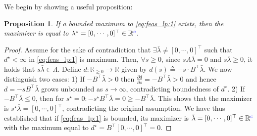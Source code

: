 \documentclass[letterpaper, 10 pt, conference]{ieeeconf}  %
\newtheorem{proposition}{\textbf{Proposition}}
\begin{document}
We begin by showing a useful proposition:
\begin{proposition}\label{prop:lambda_zero}
    If a bounded {\color{blue} maximum} to \eqref{eq:feas_lp:1} exists, then {\color{blue}the maximizer is equal to} $\lambda^\star = [0,\cdots,0]^\top \in \mathbb{R}{\color{blue}^c}$.
\end{proposition}
\begin{proof}
    Assume for the sake of contradiction that $\exists \bar{\lambda}\neq [0,\cdots,0]^\top$ such that {\color{blue} $d^\star < \infty$ in} \eqref{eq:feas_lp:1} is maximum. Then, $\forall s \geq 0$, since $s A \bar{\lambda} = 0$ and $s\bar{\lambda} \geq 0$, it holds that  $s\bar{\lambda} \in\Lambda$. Define $d:\mathbb{R}_{\geq 0}\rightarrow \mathbb{R}$ given by {\color{blue}$d(s) \triangleq -s \cdot B^\top \bar{\lambda}$}. We now distinguish two cases: 1) If $-B^\top \bar{\lambda} > 0 $ then $\frac{\partial d}{\partial s} = -B^\top\bar{\lambda} >0 $ and hence $d=-sB^\top \bar{\lambda}$ grows unbounded as $s\rightarrow\infty$, contradicting boundedness of $d^\star$. 2) If  $-B^\top \bar{\lambda} \leq 0 $, then for $s^\star = 0 :  -s^\star B^\top \bar{\lambda}=0 \geq -B^\top \bar{\lambda}$. This shows that the maximizer is $s^\star \bar{\lambda} =  [0,\cdots,0]^\top $, contradicting the original assumption. We have thus established that if \eqref{eq:feas_lp:1} is bounded, its {\color{blue}maximizer} is $\bar{\lambda} = [0,\cdots,0]^\top \in \mathbb{R}{\color{blue}^c}$ with the {\color{blue}maximum equal to $d^\star = B^\top [0,\cdots,0]^\top =  0$}.
\end{proof}
\end{document}
